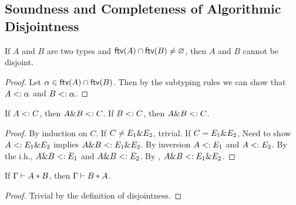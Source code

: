 \subsection{Soundness and Completeness of Algorithmic Disjointness}

%

\begin{lemma}
  If $A$ and $B$ are two types and $\textsf{ftv}(A) \cap \textsf{ftv}(B) \neq \varnothing$, then
  $A$ and $B$ cannot be disjoint.
\end{lemma}

\begin{proof}
  Let $\alpha \in \textsf{ftv}(A) \cap \textsf{ftv}(B)$. Then by the subtyping rules we can show
  that $A <: \alpha$ and $B <: \alpha$.
\end{proof}

\begin{theorem}
  If $A <: C$, then $A \& B <: C$.
  If $B <: C$, then $A \& B <: C$.
\end{theorem}


\begin{proof}
  By induction on $C$.
  If $C \neq E_1 \& E_2$, trivial.
  If $C = E_1 \& E_2$,
  Need to show $A <: E_1 \& E_2$ implies $A \& B <: E_1 \& E_2$.
  By inversion $A <: E_1$ and $A <: E_2$.
  By the i.h., $A \& B <: E_1$ and $A \& B <: E_2$.
  By , $A \& B <: E_1 \& E_2$.
\end{proof}

\begin{lemma}
  \label{lemma:symmetry-of-disjointness}

  If $\Gamma \vdash A * B$, then $\Gamma \vdash B * A$.
\end{lemma}

\begin{proof}
  Trivial by the definition of disjointness.
\end{proof}

